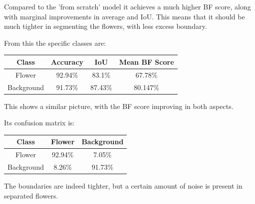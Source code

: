 \documentclass{article}
\begin{document}
Compared to the 'from scratch' model it achieves a much higher BF score, along with marginal improvements in average and IoU. This means that it should be much tighter in segmenting the flowers, with less excess boundary.

From this the specific classes are:


\begin{center}
    \begin{tabular}{| c |c | c  | c |} 
     \hline
    Class & Accuracy & IoU & Mean BF Score \\ [0.5ex] 
     \hline
     Flower & 92.94\% & 83.1\% & 67.78\% \\ 
     \hline
     Background & 91.73\% & 87.43\% & 80.147\% \\ 
     \hline
    \end{tabular}
\end{center}

This shows a similar picture, with the BF score improving in both aspects.

Its confusion matrix is:


\begin{center}
    \begin{tabular}{| c |c | c |} 
     \hline
    Class  & Flower & Background \\ [0.5ex] 
     \hline
     Flower & 92.94\% & 7.05\% \\ 
     \hline
     Background & 8.26\% & 91.73\%\\ 
     \hline
    \end{tabular}
\end{center}

 The boundaries are indeed tighter, but a certain amount of noise is present in separated flowers.
\end{document}

